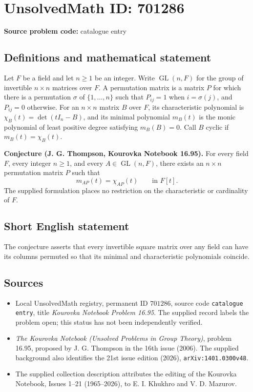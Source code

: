 \documentclass[11pt]{article}
\begin{document}
\section*{UnsolvedMath ID: 701286}
\textbf{Source problem code:} catalogue entry
\subsection{Definitions and mathematical statement}
Let \(F\) be a field and let \(n\geq 1\) be an integer. Write \(\operatorname{GL}(n,F)\) for the group of invertible \(n\times n\) matrices over \(F\). A permutation matrix is a matrix \(P\) for which there is a permutation \(\sigma\) of \(\{1,\ldots,n\}\) such that \(P_{ij}=1\) when \(i=\sigma(j)\), and \(P_{ij}=0\) otherwise. For an \(n\times n\) matrix \(B\) over \(F\), its characteristic polynomial is \(\chi_B(t)=\det(tI_n-B)\), and its minimal polynomial \(m_B(t)\) is the monic polynomial of least positive degree satisfying \(m_B(B)=0\). Call \(B\) cyclic if \(m_B(t)=\chi_B(t)\).

\textbf{Conjecture (J. G. Thompson, Kourovka Notebook 16.95).} For every field \(F\), every integer \(n\geq 1\), and every \(A\in\operatorname{GL}(n,F)\), there exists an \(n\times n\) permutation matrix \(P\) such that
\[
 m_{AP}(t)=\chi_{AP}(t)\qquad\text{in }F[t].
\]
The supplied formulation places no restriction on the characteristic or cardinality of \(F\).
\subsection{Short English statement}
The conjecture asserts that every invertible square matrix over any field can have its columns permuted so that its minimal and characteristic polynomials coincide.
\subsection{Sources}
\begin{itemize}
\item Local UnsolvedMath registry, permanent ID \(701286\), source code \texttt{catalogue entry}, title \emph{Kourovka Notebook Problem 16.95}. The supplied record labels the problem open; this status has not been independently verified.
\item \emph{The Kourovka Notebook (Unsolved Problems in Group Theory)}, problem 16.95, proposed by J. G. Thompson in the 16th issue (2006). The supplied background also identifies the 21st issue edition (2026), \texttt{arXiv:1401.0300v48}.
\item The supplied collection description attributes the editing of the Kourovka Notebook, Issues 1--21 (1965--2026), to E. I. Khukhro and V. D. Mazurov.
\end{itemize}
\end{document}
